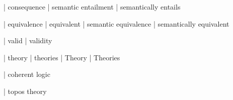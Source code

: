  | consequence
 | semantic entailment
 | semantically entails

 | equivalence
 | equivalent
 | semantic equivalence
 | semantically equivalent

 | valid
 | validity

 | theory
 | theories
 | Theory
 | Theories

 | coherent logic

 | topos theory


